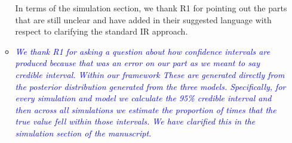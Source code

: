 \begin{enumerate}
\begin{itemize}
{{		In terms of the simulation section, we thank R1 for pointing out the parts that are still unclear and have added in their suggested language with respect to clarifying the standard IR approach.
		}}
		\item  \emph{ \textcolor{blue}{
		We thank R1 for asking a question about how confidence intervals are produced because that was an error on our part as we meant to say credible interval. Within our framework These are generated directly from the posterior distribution generated from the three models. Specifically, for every simulation and model we calculate the 95\% credible interval and then across all simulations we estimate the proportion of times that the true value fell within those intervals. We have clarified this in the simulation section of the manuscript.}}
	\end{itemize}
\end{enumerate}

